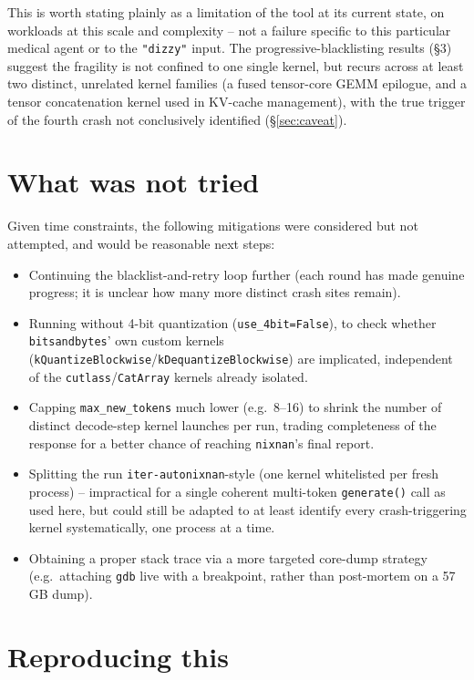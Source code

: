 \documentclass[11pt]{article}
\begin{document}
This is worth stating plainly as a limitation of the tool at its current
state, on workloads at this scale and complexity -- not a failure specific
to this particular medical agent or to the \texttt{"dizzy"} input. The
progressive-blacklisting results (\S3) suggest the fragility is not
confined to one single kernel, but recurs across at least two distinct,
unrelated kernel families (a fused tensor-core GEMM epilogue, and a tensor
concatenation kernel used in KV-cache management), with the true trigger
of the fourth crash not conclusively identified (\S\ref{sec:caveat}).

\section{What was not tried}

Given time constraints, the following mitigations were considered but not
attempted, and would be reasonable next steps:

\begin{itemize}
  \item Continuing the blacklist-and-retry loop further (each round has
    made genuine progress; it is unclear how many more distinct crash
    sites remain).
  \item Running without 4-bit quantization (\texttt{use\_4bit=False}), to
    check whether \texttt{bitsandbytes}' own custom kernels
    (\texttt{kQuantizeBlockwise}/\texttt{kDequantizeBlockwise}) are
    implicated, independent of the \texttt{cutlass}/\texttt{CatArray}
    kernels already isolated.
  \item Capping \texttt{max\_new\_tokens} much lower (e.g.\ 8--16) to
    shrink the number of distinct decode-step kernel launches per run,
    trading completeness of the response for a better chance of reaching
    \texttt{nixnan}'s final report.
  \item Splitting the run \texttt{iter-autonixnan}-style (one kernel
    whitelisted per fresh process) -- impractical for a single coherent
    multi-token \texttt{generate()} call as used here, but could still be
    adapted to at least identify every crash-triggering kernel
    systematically, one process at a time.
  \item Obtaining a proper stack trace via a more targeted core-dump
    strategy (e.g.\ attaching \texttt{gdb} live with a breakpoint, rather
    than post-mortem on a 57\,GB dump).
\end{itemize}

\section{Reproducing this}
\end{document}
